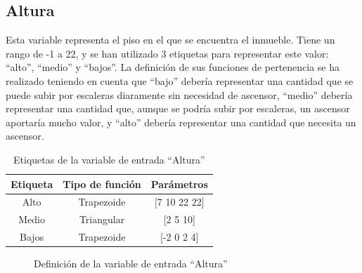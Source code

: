\documentclass[12pt]{report} %
\begin{document}
        \subsection{Altura}
        Esta variable representa el piso en el que se encuentra el inmueble.
        Tiene un rango de -1 a 22, y se han utilizado 3 etiquetas para representar este valor: ``alto'', ``medio'' y ``bajos''.
        La definición de sus funciones de pertenencia se ha realizado teniendo en cuenta que ``bajo'' debería representar una cantidad que se puede subir por escaleras diaramente sin necesidad de ascensor,
        ``medio'' debería representar una cantidad que, aunque se podría subir por escaleras, un ascensor aportaría mucho valor, y ``alto'' debería representar una cantidad que necesita un ascensor.

        \begin{table}[h]
            \center
            \begin{tabular}{@{}ccc@{}}
                \toprule
                \textbf{Etiqueta} & \textbf{Tipo de función} & \textbf{Parámetros} \\
                \midrule
                Alto  & Trapezoide & [7 10 22 22] \\
                Medio & Triangular & [2 5 10]     \\
                Bajos & Trapezoide & [-2 0 2 4]   \\
                \bottomrule
            \end{tabular}
            \caption{Etiquetas de la variable de entrada ``Altura''}
        \end{table}

        \begin{figure}[H]
            \centering
            \caption{Definición de la variable de entrada ``Altura''}
        \end{figure}
\end{document}
